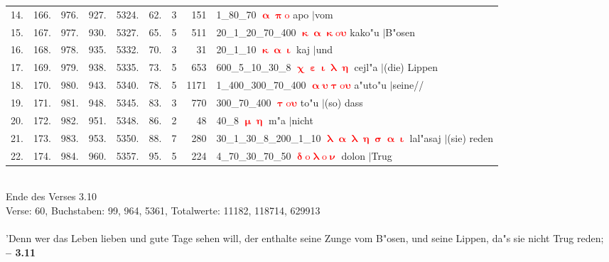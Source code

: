 \documentclass[a4paper,10pt,landscape]{article}
\begin{document}
\begin{tabular}{rrrrrrrrp{120mm}}
14.&166.&976.&927.&5324.&62.&3&151&1\_80\_70 \textcolor{red}{$\boldsymbol{\upalpha\uppi\mathrm{o}}$} apo $|$vom\\
15.&167.&977.&930.&5327.&65.&5&511&20\_1\_20\_70\_400 \textcolor{red}{$\boldsymbol{\upkappa\upalpha\upkappa\mathrm{o}\upsilon}$} kako"u $|$B"osen\\
16.&168.&978.&935.&5332.&70.&3&31&20\_1\_10 \textcolor{red}{$\boldsymbol{\upkappa\upalpha\upiota}$} kaj $|$und\\
17.&169.&979.&938.&5335.&73.&5&653&600\_5\_10\_30\_8 \textcolor{red}{$\boldsymbol{\upchi\upepsilon\upiota\uplambda\upeta}$} cejl"a $|$(die) Lippen\\
18.&170.&980.&943.&5340.&78.&5&1171&1\_400\_300\_70\_400 \textcolor{red}{$\boldsymbol{\upalpha\upsilon\uptau\mathrm{o}\upsilon}$} a"uto"u $|$seine//\\
19.&171.&981.&948.&5345.&83.&3&770&300\_70\_400 \textcolor{red}{$\boldsymbol{\uptau\mathrm{o}\upsilon}$} to"u $|$(so) dass\\
20.&172.&982.&951.&5348.&86.&2&48&40\_8 \textcolor{red}{$\boldsymbol{\upmu\upeta}$} m"a $|$nicht\\
21.&173.&983.&953.&5350.&88.&7&280&30\_1\_30\_8\_200\_1\_10 \textcolor{red}{$\boldsymbol{\uplambda\upalpha\uplambda\upeta\upsigma\upalpha\upiota}$} lal"asaj $|$(sie) reden\\
22.&174.&984.&960.&5357.&95.&5&224&4\_70\_30\_70\_50 \textcolor{red}{$\boldsymbol{\updelta\mathrm{o}\uplambda\mathrm{o}\upnu}$} dolon $|$Trug\\
\end{tabular}\medskip \\
Ende des Verses 3.10\\
Verse: 60, Buchstaben: 99, 964, 5361, Totalwerte: 11182, 118714, 629913\\
\\
'Denn wer das Leben lieben und gute Tage sehen will, der enthalte seine Zunge vom B"osen, und seine Lippen, da"s sie nicht Trug reden;\\
\newpage 
{\bf -- 3.11}\\
\medskip \\
\end{document}
